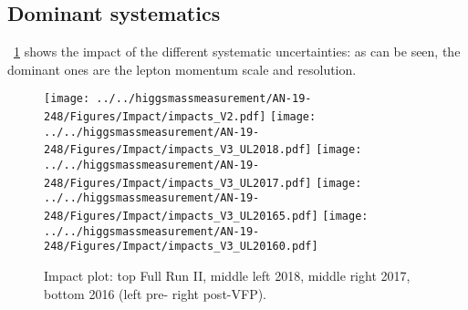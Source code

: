 \subsection{Dominant systematics}
\figurename~\ref{mass_impact} shows the impact of the different systematic uncertainties: as can be seen,
the dominant ones are the lepton momentum scale and resolution.
\begin{figure}[!htbp]
\begin{center}
	\texttt{[image: ../../higgsmassmeasurement/AN-19-248/Figures/Impact/impacts\_V2.pdf]}
	\texttt{[image: ../../higgsmassmeasurement/AN-19-248/Figures/Impact/impacts\_V3\_UL2018.pdf]}
	\texttt{[image: ../../higgsmassmeasurement/AN-19-248/Figures/Impact/impacts\_V3\_UL2017.pdf]}
	\texttt{[image: ../../higgsmassmeasurement/AN-19-248/Figures/Impact/impacts\_V3\_UL20165.pdf]}
	\texttt{[image: ../../higgsmassmeasurement/AN-19-248/Figures/Impact/impacts\_V3\_UL20160.pdf]}
	\caption{Impact plot: top Full Run II, middle left 2018, middle right 2017, bottom
	2016 (left pre- right post-VFP).}
	\label{mass_impact}
\end{center}
\end{figure}

